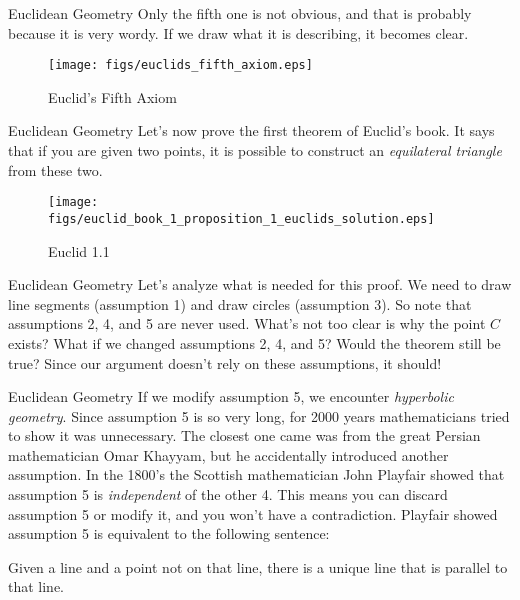 \documentclass{beamer}
\begin{document}
    \begin{frame}{Euclidean Geometry}
        Only the fifth one is not obvious, and that is probably because it is very wordy.
        If we draw what it is describing, it becomes clear.
        \begin{figure}
            \centering
            \texttt{[image: figs/euclids\_fifth\_axiom.eps]}
            \caption{Euclid's Fifth Axiom}
            \label{fig:euclids_fifth_axiom}
        \end{figure}
    \end{frame}
    \begin{frame}{Euclidean Geometry}
        Let's now prove the first theorem of Euclid's book. It says that
        if you are given two points, it is possible to construct an
        \textit{equilateral triangle} from these two.
        \begin{figure}
            \centering
            \texttt{[image: figs/euclid\_book\_1\_proposition\_1\_euclids\_solution.eps]}
            \caption{Euclid 1.1}
            \label{fig:euclid_book_1_proposition_1_euclids_solution}
        \end{figure}
    \end{frame}
    \begin{frame}{Euclidean Geometry}
        Let's analyze what is needed for this proof. We need to draw
        line segments (assumption 1) and draw circles (assumption 3).
        So note that assumptions 2, 4, and 5 are never used. What's not
        too clear is why the point $C$ exists? What if we changed assumptions
        2, 4, and 5? Would the theorem still be true? Since our argument doesn't
        rely on these assumptions, it should!
    \end{frame}
    \begin{frame}{Euclidean Geometry}
        If we modify assumption 5, we encounter \textit{hyperbolic geometry}. Since
        assumption 5 is so very long, for 2000 years mathematicians tried to show it was
        unnecessary. The closest one came was from the great Persian mathematician
        Omar Khayyam, but he accidentally introduced another assumption. In the
        1800's the Scottish mathematician John Playfair showed that assumption 5 is
        \textit{independent} of the other 4. This means you can discard assumption 5
        or modify it, and you won't have a contradiction. Playfair showed assumption 5
        is equivalent to the following sentence:
        \begin{center}
            Given a line and a point not on that line, there is a unique line that is
            parallel to that line.
        \end{center}
    \end{frame}
\end{document}
